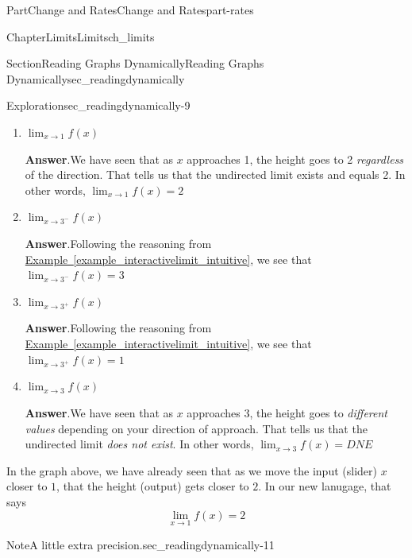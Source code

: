 \documentclass{tufte-book}
\newcommand{\blocktitlefont}{\relax}
\newcommand{\xreffont}{\relax}
\numberwithin{equation}{chapter}
\begin{document}
\begin{partptx}{Part}{Change and Rates}{}{Change and Rates}{}{}{part-rates}
\begin{chapterptx}{Chapter}{Limits}{}{Limits}{}{}{ch_limits}
\begin{sectionptx}{Section}{Reading Graphs Dynamically}{}{Reading Graphs Dynamically}{}{}{sec_readingdynamically}
\begin{exploration}{Exploration}{}{sec_readingdynamically-9}
\begin{enumerate}[font=\bfseries,label=(\alph*),ref=\alph*]
\par\smallskip%
\noindent\textbf{\blocktitlefont Answer}.\hypertarget{sec_readingdynamically-9-3-2}{}\quad{}Following the reasoning from \hyperref[example_interactivelimit_intuitive]{Example~{\xreffont\ref{example_interactivelimit_intuitive}}}, we see that \(\lim_{x\rightarrow 1^+} f(x)=2\)%
\item{}\(\displaystyle \lim_{x\rightarrow 1} f(x)\)%
\par\smallskip%
\noindent\textbf{\blocktitlefont Answer}.\hypertarget{sec_readingdynamically-9-4-2}{}\quad{}We have seen that as \(x\) approaches 1, the height goes to 2 \emph{regardless} of the direction.  That tells us that the undirected limit exists and equals 2.  In other words, \(\lim_{x\rightarrow 1} f(x)=2\)%
\item{}\(\displaystyle \lim_{x\rightarrow 3^-} f(x)\)%
\par\smallskip%
\noindent\textbf{\blocktitlefont Answer}.\hypertarget{sec_readingdynamically-9-5-2}{}\quad{}Following the reasoning from \hyperref[example_interactivelimit_intuitive]{Example~{\xreffont\ref{example_interactivelimit_intuitive}}}, we see that \(\lim_{x\rightarrow 3^-} f(x)=3\)%
\item{}\(\displaystyle \lim_{x\rightarrow 3^+} f(x)\)%
\par\smallskip%
\noindent\textbf{\blocktitlefont Answer}.\hypertarget{sec_readingdynamically-9-6-2}{}\quad{}Following the reasoning from \hyperref[example_interactivelimit_intuitive]{Example~{\xreffont\ref{example_interactivelimit_intuitive}}}, we see that \(\lim_{x\rightarrow 3^+} f(x)=1\)%
\item{}\(\displaystyle \lim_{x\rightarrow 3} f(x)\)%
\par\smallskip%
\noindent\textbf{\blocktitlefont Answer}.\hypertarget{sec_readingdynamically-9-7-2}{}\quad{}We have seen that as \(x\) approaches 3, the height goes to \emph{different values} depending on your direction of approach.  That tells us that the undirected limit \emph{does not exist}.  In other words, \(\lim_{x\rightarrow 3} f(x)= DNE\)%
\end{enumerate}%
\end{exploration}%
In the graph above, we have already seen that as we move the input (slider) \(x\) closer to \(1\), that the height (output) gets closer to \(2\).  In our new lanugage, that says%
\begin{equation*}
\lim_{x\rightarrow 1} f(x) = 2
\end{equation*}
%
\begin{note}{Note}{A little extra precision.}{sec_readingdynamically-11}%

\end{note}
\end{sectionptx}
\end{chapterptx}
\end{partptx}
\end{document}
